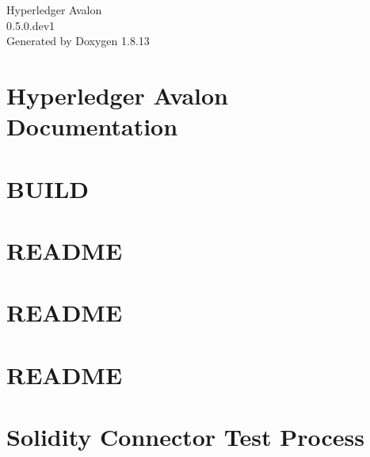 \documentclass[twoside]{book}
\newcommand{\+}{\discretionary{\mbox{\scriptsize$\hookleftarrow$}}{}{}}
\newcommand{\clearemptydoublepage}{%
  \newpage{\pagestyle{empty}\cleardoublepage}%
}
\begin{document}
\hypersetup{pageanchor=false,
             bookmarksnumbered=true,
             pdfencoding=unicode
            }
\begin{titlepage}
\vspace*{7cm}
\begin{center}%
{\Large Hyperledger Avalon \\[1ex]\large 0.\+5.\+0.\+dev1 }\\
\vspace*{1cm}
{\large Generated by Doxygen 1.8.13}\\
\end{center}
\end{titlepage}
\clearemptydoublepage
{}
\tableofcontents
\clearemptydoublepage
{}
\hypersetup{pageanchor=true}

\chapter{Hyperledger Avalon Documentation}
\label{index}\hypertarget{index}{}
\chapter{B\+U\+I\+LD}
\label{md__home_dano_git_avalon_common_cpp_BUILD}

\chapter{R\+E\+A\+D\+ME}
\label{md__home_dano_git_avalon_common_cpp_crypto_README}

\chapter{R\+E\+A\+D\+ME}
\label{md__home_dano_git_avalon_common_cpp_README}

\chapter{R\+E\+A\+D\+ME}
\label{md__home_dano_git_avalon_common_sgx_workload_README}

\chapter{Solidity Connector Test Process}
\label{md__home_dano_git_avalon_sdk_TestingContracts}

\end{document}
